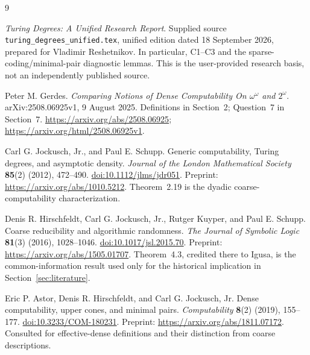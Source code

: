 \documentclass[11pt,a4paper]{article}
\newcommand{\code}[1]{\texttt{#1}}
\theoremstyle{definition}\newtheorem{definition}[theorem]{Definition}
\theoremstyle{remark}\newtheorem{remark}[theorem]{Remark}
\begin{document}
\begin{thebibliography}{9}
\raggedright
{}
\emph{Turing Degrees: A Unified Research Report}.
Supplied source \code{turing\_degrees\_unified.tex}, unified edition dated 18 September 2026, prepared for Vladimir Reshetnikov. In particular, C1--C3 and the sparse-coding/minimal-pair diagnostic lemmas. This is the user-provided research basis, not an independently published source.

Peter M. Gerdes.
\emph{Comparing Notions of Dense Computability On $\omega^\omega$ and $2^\omega$}.
arXiv:2508.06925v1, 9 August 2025.
Definitions in Section~2; Question~7 in Section~7.
\url{https://arxiv.org/abs/2508.06925};
\url{https://arxiv.org/html/2508.06925v1}.

Carl G. Jockusch, Jr., and Paul E. Schupp.
Generic computability, Turing degrees, and asymptotic density.
\emph{Journal of the London Mathematical Society} \textbf{85}(2) (2012), 472--490.
\href{https://doi.org/10.1112/jlms/jdr051}{doi:10.1112/jlms/jdr051}.
Preprint: \url{https://arxiv.org/abs/1010.5212}.
Theorem~2.19 is the dyadic coarse-computability characterization.

Denis R. Hirschfeldt, Carl G. Jockusch, Jr., Rutger Kuyper, and Paul E. Schupp.
Coarse reducibility and algorithmic randomness.
\emph{The Journal of Symbolic Logic} \textbf{81}(3) (2016), 1028--1046.
\href{https://doi.org/10.1017/jsl.2015.70}{doi:10.1017/jsl.2015.70}.
Preprint: \url{https://arxiv.org/abs/1505.01707}.
Theorem~4.3, credited there to Igusa, is the common-information result used only for the historical implication in Section~\ref{sec:literature}.

Eric P. Astor, Denis R. Hirschfeldt, and Carl G. Jockusch, Jr.
Dense computability, upper cones, and minimal pairs.
\emph{Computability} \textbf{8}(2) (2019), 155--177.
\href{https://doi.org/10.3233/COM-180231}{doi:10.3233/COM-180231}.
Preprint: \url{https://arxiv.org/abs/1811.07172}.
Consulted for effective-dense definitions and their distinction from coarse descriptions.
\end{thebibliography}
\end{document}
